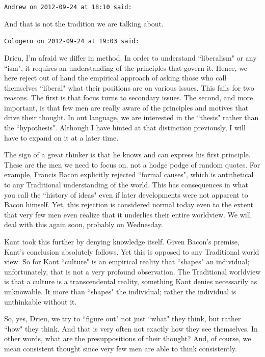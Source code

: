 \begin{footnotesize}
\begin{sffamily}
\hfill

\texttt{Andrew on 2012-09-24 at 18:10 said: }

And that is not the tradition we are talking about.


\hfill

\texttt{Cologero on 2012-09-24 at 19:03 said: }

Drieu, I'm afraid we differ in method. In order to understand ``liberalism" or any ``ism", it requires an understanding of the principles that govern it. Hence, we here reject out of hand the empirical approach of asking those who call themselves ``liberal" what their positions are on various issues. This fails for two reasons. The first is that focus turns to secondary issues. The second, and more important, is that few men are really aware of the principles and motives that drive their thought. In out language, we are interested in the ``thesis" rather than the ``hypothesis". Although I have hinted at that distinction previously, I will have to expand on it at a later time.

The sign of a great thinker is that he knows and can express his first principle. These are the men we need to focus on, not a hodge podge of random quotes. For example, Francis Bacon explicitly rejected ``formal causes", which is antithetical to any Traditional understanding of the world. This has consequences in what you call the ``history of ideas" even if later developments were not apparent to Bacon himself. Yet, this rejection is considered normal today even to the extent that very few men even realize that it underlies their entire worldview. We will deal with this again soon, probably on Wednesday.

Kant took this further by denying knowledge itself. Given Bacon's premise, Kant's conclusion absolutely follows. Yet this is opposed to any Traditional world view. So for Kant ``culture" is an empirical reality that ``shapes" an individual; unfortunately, that is not a very profound observation. The Traditional worldview is that a culture is a transcendental reality, something Kant denies necessarily as unknowable. It more than ``shapes" the individual; rather the individual is unthinkable without it.

So, yes, Drieu, we try to ``figure out" not just ``what" they think, but rather ``how" they think. And that is very often not exactly how they see themselves. In other words, what are the presuppositions of their thought? And, of course, we mean consistent thought since very few men are able to think consistently.


\end{sffamily}
\end{footnotesize}
